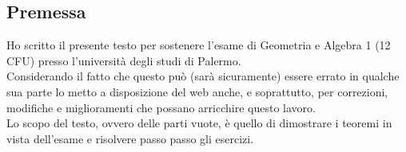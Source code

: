 \begin{center}
\section*{Premessa}
\end{center}
\begin{flushleft}
Ho scritto il presente testo per sostenere l'esame di Geometria e Algebra 1 (12 CFU) presso l'università degli studi di Palermo.\\
Considerando il fatto che questo può (sarà sicuramente) essere errato in qualche sua parte lo metto a disposizione del web anche, e soprattutto, per correzioni, modifiche e miglioramenti che possano arricchire questo lavoro.\\
Lo scopo del testo, ovvero delle parti vuote, è quello di dimostrare i teoremi in vista dell'esame e risolvere passo passo gli esercizi.

\end{flushleft}
\newpage
\tableofcontents
\newpage
\begin{center}
\end{center}
